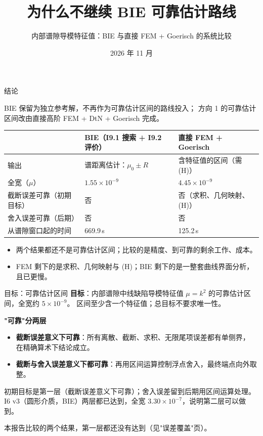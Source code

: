 \documentclass[aspectratio=169,11pt,fontset=fandol]{ctexbeamer}
\title{为什么不继续 BIE 可靠估计路线}
\subtitle{内部谱隙导模特征值：BIE 与直接 FEM + Goerisch 的系统比较}
\date{2026 年 11 月}
\newcommand{\key}[1]{\begin{keybox}#1\end{keybox}}
\newcommand{\aside}[1]{{\footnotesize\color{muted}#1}}
\newcommand{\no}{\textcolor{muted}{否}}
\begin{document}
\begin{frame}[plain]
  \titlepage
\end{frame}

\begin{frame}{结论}
  \key{BIE 保留为\alert{独立参考解}，不再作为可靠估计区间的路线投入；
    方向 1 的可靠估计区间改由\alert{直接高阶 FEM + DtN + Goerisch} 完成。}
  \vspace{0.3em}
  \centering\small
  \begin{tabular}{lll}
    \toprule
    & BIE（I9.1 搜索 + I9.2 评价） & 直接 FEM + Goerisch \\
    \midrule
    输出 & 谱距离估计：$\mu_0\pm R$ & 含特征值的区间（需 (H)） \\
    全宽（$\mu$） & $1.55\times10^{-9}$ & $4.45\times10^{-9}$ \\
    截断误差可靠（初期目标） & \no & \no（求积、几何映射、(H)） \\
    舍入误差可靠（后期） & \no & \no \\
    从谱隙窗口起的时间 & 669.9\,s & 125.2\,s \\
    \bottomrule
  \end{tabular}
  \raggedright
  \vspace{0.4em}
  \begin{itemize}
    \item 两个结果\alert{都还不是}可靠估计区间；比较的是精度、到可靠的剩余工作、成本。
    \item FEM 剩下的是求积、几何映射与 (H)；BIE 剩下的是一整套曲线界面分析，且已更慢。
  \end{itemize}
\end{frame}

\begin{frame}{目标：可靠估计区间}
  \textbf{目标}：内部谱隙中线缺陷导模特征值 $\mu=k^2$ 的\alert{可靠估计区间}，全宽约 $5\times10^{-9}$。
  区间至少含一个特征值；总目标\alert{不要求唯一性}。
  \vspace{0.5em}

  \textbf{"可靠"分两层}
  \begin{itemize}
    \item \textbf{截断误差意义下可靠}：所有离散、截断、求积、无限尾项误差都有单侧界，
      在精确算术下结论成立。
    \item \textbf{截断与舍入误差意义下都可靠}：再用区间运算控制浮点舍入，最终端点向外取整。
  \end{itemize}
  \vspace{0.3em}
  \key{初期目标是\alert{第一层}（截断误差意义下可靠）；舍入误差留到后期用区间运算处理。
    I6 v3（圆形介质，BIE）两层都已达到，全宽 $3.30\times10^{-7}$，说明第二层可以做到。}
  \aside{本报告比较的两个结果，第一层都还没有达到（见"误差覆盖"页）。}
\end{frame}
\end{document}
